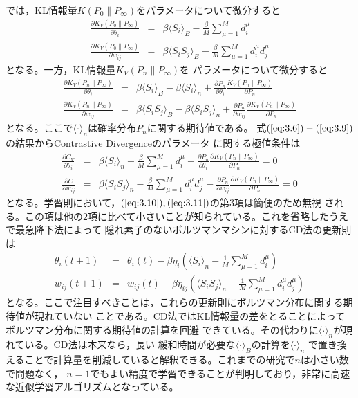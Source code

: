 では，KL情報量$K(P_{0}\parallel P_{\infty})$をパラメータについて微分すると
\begin{eqnarray}
\frac{\partial K_{V}(P_{0}\parallel P_{\infty})}
{\partial\theta_{i}}&=&\beta\langle S_{i}\rangle_{B}
-\frac{\beta}{M}\sum_{\mu=1}^{M}d_{i}^{\mu}\label{eq:3.6}\\
\frac{\partial K_{V}(P_{0}\parallel P_{\infty})}
{\partial w_{ij}}&=&\beta\langle S_{i}S_{j}\rangle_{B}
-\frac{\beta}{M}\sum_{\mu=1}^{M}d_{i}^{\mu}d_{j}^{\mu}
\label{eq:3.7}
\end{eqnarray}
となる。一方，KL情報量$K_{V}(P_{n}\parallel P_{\infty})$を
パラメータについて微分すると
\begin{eqnarray}
\frac{\partial K_{V}(P_{n}\parallel P_{\infty})}
{\partial\theta_{i}}&=&\beta\langle S_{i}\rangle_{B}
-\beta\langle S_{i}\rangle_{n}
+\frac{\partial P_{n}}{\partial\theta_{i}}
\frac{K_{V}(P_{n}\parallel P_{\infty})}{\partial P_{n}}\label{eq:3.8}\\
\frac{\partial K_{V}(P_{n}\parallel P_{\infty})}{\partial w_{ij}}
&=&\beta\langle S_{i}S_{j}\rangle_{B}-\beta\langle S_{i}S_{j}\rangle_{n}
+\frac{\partial P_{n}}{\partial w_{ij}}
\frac{\partial K_{V}(P_{n}\parallel P_{\infty})}{\partial P_{n}}
\label{eq:3.9}
\end{eqnarray}
となる。ここで$\langle\cdot\rangle_{n}$は確率分布$P_{n}$に関する期待値である。
式$(\ref{eq:3.6})-(\ref{eq:3.9})$の結果からContrastive Divergenceのパラメータ
に関する極値条件は
\begin{eqnarray}
\frac{\partial C_{V}}{\partial\theta_{i}}&=&\beta\langle S_{i}\rangle_{n}
-\frac{\beta}{M}\sum_{\mu=1}^{M}d_{i}^{\mu}-\frac{\partial
P_{n}}{\partial\theta_{i}}\frac{\partial K_{V}(P_{n}\parallel P_{\infty})}
{\partial P_{n}}=0\label{eq:3.10}\\
\frac{\partial C}{\partial w_{ij}}&=&\beta\langle S_{i}S_{j}\rangle_{n}
-\frac{\beta}{M}\sum_{\mu=1}^{M}d_{i}^{\mu}d_{j}^{\mu}
-\frac{\partial P_{n}}{\partial w_{ij}}\frac{\partial
K_{V}(P_{n}\parallel P_{\infty})}{\partial P_{n}}=0\label{eq:3.11}
\end{eqnarray}
となる。学習則において，$(\ref{eq:3.10}),(\ref{eq:3.11})$の第$3$項は簡便のため無視
される。この項は他の$2$項に比べて小さいことが知られている。これを省略したうえで最急降下法によって
隠れ素子のないボルツマンマシンに対するCD法の更新則は
\begin{eqnarray}
\theta_{i}(t+1)&=&\theta_{i}(t)-\beta\eta_{i}
\left(\langle S_{i}\rangle_{n}-\frac{1}{M}\sum_{\mu=1}^{M}d_{i}^{\mu}\right)
\label{eq:3.12}\\
w_{ij}(t+1)&=&w_{ij}(t)-\beta\eta_{ij}\left(\langle S_{i}S_{j}\rangle_{n}
-\frac{1}{M}\sum_{\mu=1}^{M}d_{i}^{\mu}d_{j}^{\mu}\right)
\label{eq:3.13}
\end{eqnarray}
となる。ここで注目すべきことは，これらの更新則にボルツマン分布に関する期待値が現れていない
ことである。CD法ではKL情報量の差をとることによってボルツマン分布に関する期待値の計算を回避
できている。その代わりに$\langle\cdot\rangle_{n}$が現れている。CD法は本来なら，長い
緩和時間が必要な$\langle\cdot\rangle_{B}$の計算を$\langle\cdot\rangle_{n}$
で置き換えることで計算量を削減していると解釈できる。これまでの研究で$n$は小さい数で問題なく，
$n=1$でもよい精度で学習できることが判明しており，非常に高速な近似学習アルゴリズムとなっている。
